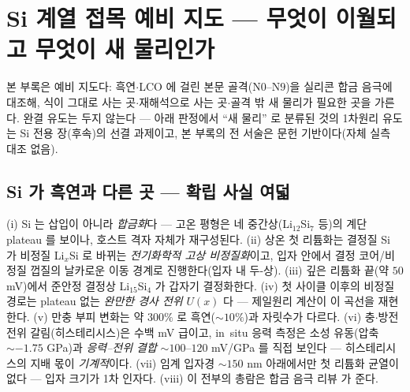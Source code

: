 \section{Si 계열 접목 예비 지도 --- 무엇이 이월되고 무엇이 새 물리인가}\label{sec:appendix-si}
본 부록은 예비 지도다: 흑연$\cdot$LCO 에 걸린 본문 골격($\mathrm{N0}$--$\mathrm{N9}$)을 실리콘 합금
음극에 대조해, 식이 그대로 사는 곳$\cdot$재해석으로 사는 곳$\cdot$골격 밖 새 물리가 필요한 곳을
가른다. 완결 유도는 두지 않는다 --- 아래 판정에서 ``새 물리'' 로 분류된 것의 1차원리 유도는 Si 전용
장(후속)의 선결 과제이고, 본 부록의 전 서술은 문헌 기반이다(자체 실측 대조 없음).

\subsection{Si 가 흑연과 다른 곳 --- 확립 사실 여덟}\label{ssec:si-facts}
(i) Si 는 삽입이 아니라 \emph{합금화}다 --- 고온 평형은 네 중간상(Li$_{12}$Si$_7$ 등)의 계단
plateau 를 보이나\cite{wen_huggins1981}, 호스트 격자 자체가 재구성된다. (ii) 상온 첫 리튬화는
결정질 Si 가 비정질 Li$_x$Si 로 바뀌는 \emph{전기화학적 고상 비정질화}이고, 입자 안에서 결정
코어/비정질 껍질의 날카로운 이동 경계로 진행한다(입자 내 두-상)\cite{limthongkul2003,li_dahn2007}.
(iii) 깊은 리튬화 끝(약 $50$ mV)에서 준안정 결정상 Li$_{15}$Si$_4$ 가 갑자기
결정화한다\cite{obrovac_christensen2004}. (iv) 첫 사이클 이후의 비정질 경로는 plateau 없는 \emph{완만한
경사 전위} $U(x)$ 다 --- 제일원리 계산이 이 곡선을 재현한다\cite{chevrier_dahn2009}. (v) 만충 부피
변화는 약 $300\%$ 로\cite{beaulieu2001} 흑연($\sim10\%$)과 자릿수가 다르다. (vi) 충$\cdot$방전 전위
갈림(히스테리시스)은 수백 mV 급이고, in~situ 응력 측정은 소성 유동(압축 $\sim-1.75$ GPa)과
\emph{응력--전위 결합} $\sim100$--$120$ mV/GPa 를 직접 보인다\cite{sethuraman_stressevo2010,
sethuraman_stresspot2010} --- 히스테리시스의 지배 몫이 \emph{기계적}이다. (vii) 임계 입자경
$\sim150$ nm 아래에서만 첫 리튬화 균열이 없다 --- 입자 크기가 1차 인자다\cite{liu_sizefracture2012}.
(viii) 이 전부의 총람은 합금 음극 리뷰\cite{obrovac_chevrier2014} 가 준다.

